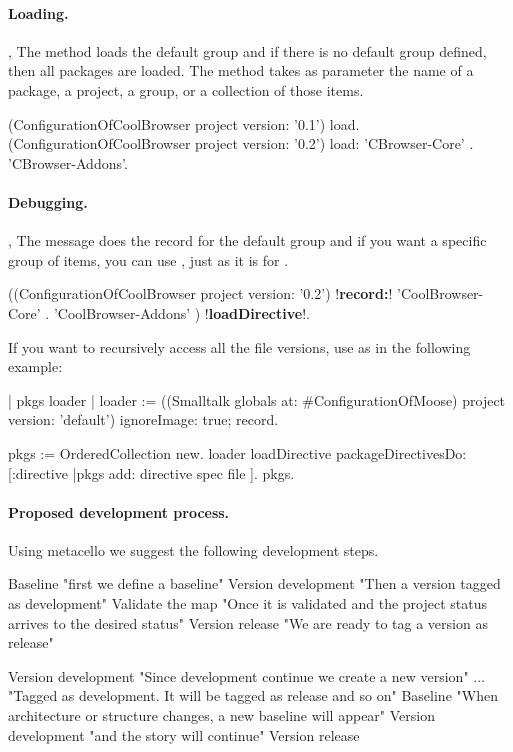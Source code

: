 \documentclass[a4paper,10pt,twoside]{book}
\begin{document}
\paragraph{Loading.} ,  The  method loads the default group and if there is no default group defined, then all packages are loaded. The   method takes as parameter the name of a package, a project, a group, or a collection of those items.

\begin{code}{}
(ConfigurationOfCoolBrowser project version: '0.1') load.
(ConfigurationOfCoolBrowser project version: '0.2') load: {'CBrowser-Core' . 'CBrowser-Addons'}.
\end{code}

\paragraph{Debugging.}
,   The message  does the record for the default group and if you want a specific group of items, you can use , just as it is for .

\begin{code}{}
((ConfigurationOfCoolBrowser project version: '0.2') !\textbf{record:}!
  		{ 'CoolBrowser-Core' .
		'CoolBrowser-Addons' }) !\textbf{loadDirective}!.
\end{code}

If you want to recursively access all the file versions, use  as in the following example:

\begin{code}{}
| pkgs loader |
loader := ((Smalltalk globals at: #ConfigurationOfMoose) project version: 'default')
      ignoreImage: true;
      record.

pkgs := OrderedCollection new.
loader loadDirective packageDirectivesDo: [:directive |pkgs add: directive spec file ].
pkgs.
\end{code}




\paragraph{Proposed development process.}
Using metacello we suggest the following development steps.


\begin{code}{}
Baseline						"first we define a baseline"
Version development			"Then a version tagged as development"
Validate the map				"Once it is validated and the project status arrives to the desired status"
Version release				"We are ready to tag a version as release"

Version development			"Since development continue we create a new version"
...							"Tagged as development. It will be tagged as release and so on"
Baseline 					"When architecture or structure changes, a new baseline will appear"
Version development			"and the story will continue"
Version release

\end{code}

\ifx\wholebook\relax\else
    
    
\end{document}
